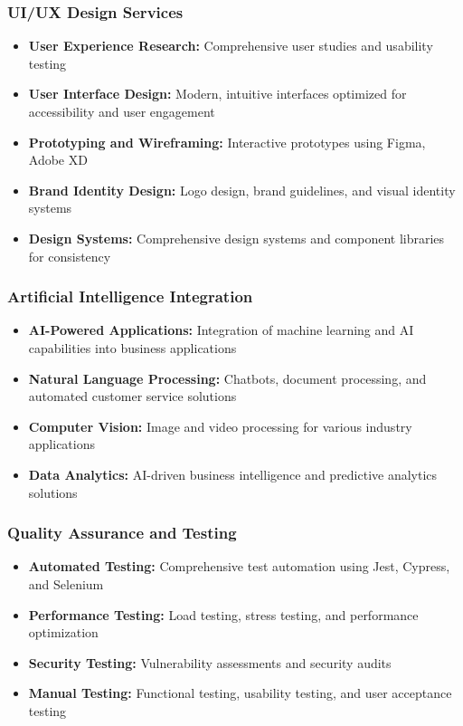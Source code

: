 \documentclass[12pt,a4paper]{report}
\newcommand{\skill}[1]{\textcolor{skillcolor}{\textbf{#1}}}
\newenvironment{coloritemize}
{\begin{itemize}[label=\textcolor{primaryblue}{$\bullet$}]}
{\end{itemize}}
\begin{document}
\subsubsection{UI/UX Design Services}
\begin{coloritemize}
    \item \skill{User Experience Research:} Comprehensive user studies and usability testing
    \item \skill{User Interface Design:} Modern, intuitive interfaces optimized for accessibility and user engagement
    \item \skill{Prototyping and Wireframing:} Interactive prototypes using Figma, Adobe XD
    \item \skill{Brand Identity Design:} Logo design, brand guidelines, and visual identity systems
    \item \skill{Design Systems:} Comprehensive design systems and component libraries for consistency
\end{coloritemize}

\subsubsection{Artificial Intelligence Integration}
\begin{coloritemize}
    \item \skill{AI-Powered Applications:} Integration of machine learning and AI capabilities into business applications
    \item \skill{Natural Language Processing:} Chatbots, document processing, and automated customer service solutions
    \item \skill{Computer Vision:} Image and video processing for various industry applications
    \item \skill{Data Analytics:} AI-driven business intelligence and predictive analytics solutions
\end{coloritemize}

\subsubsection{Quality Assurance and Testing}
\begin{coloritemize}
    \item \skill{Automated Testing:} Comprehensive test automation using Jest, Cypress, and Selenium
    \item \skill{Performance Testing:} Load testing, stress testing, and performance optimization
    \item \skill{Security Testing:} Vulnerability assessments and security audits
    \item \skill{Manual Testing:} Functional testing, usability testing, and user acceptance testing
\end{coloritemize}
\end{document}

